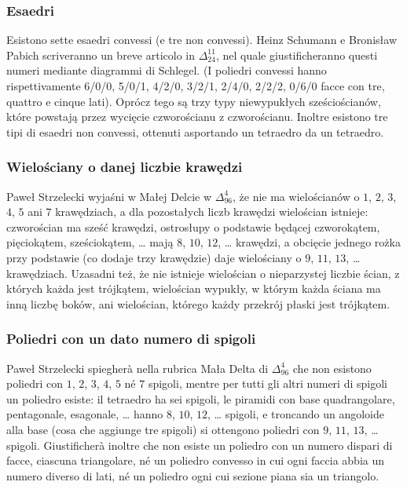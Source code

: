 \subsubsection{Esaedri} %
Esistono sette esaedri convessi (e tre non convessi). %
Heinz Schumann e Bronisław Pabich scriveranno un breve articolo in $\Delta_{24}^{11}$, nel quale giustificheranno questi numeri mediante diagrammi di Schlegel. %
(I poliedri convessi hanno rispettivamente 6/0/0, 5/0/1, 4/2/0, 3/2/1, 2/4/0, 2/2/2, 0/6/0 facce con tre, quattro e cinque lati). %
Oprócz tego są trzy typy niewypukłych sześciościanów, które powstają przez wycięcie czworościanu z czworościanu. %
Inoltre esistono tre tipi di esaedri non convessi, ottenuti asportando un tetraedro da un tetraedro. %

\subsubsection{Wielościany o danej liczbie krawędzi} %
Paweł Strzelecki wyjaśni w Małej Delcie w $\Delta_{96}^{4}$, że nie ma wielościanów o $1$, $2$, $3$, $4$, $5$ ani $7$ krawędziach, a dla pozostałych liczb krawędzi wielościan istnieje: czworościan ma sześć krawędzi, ostrosłupy o podstawie będącej czworokątem, pięciokątem, sześciokątem, \ldots{} mają $8$, $10$, $12$, \ldots{} krawędzi, a obcięcie jednego rożka przy podstawie (co dodaje trzy krawędzie) daje wielościany o $9$, $11$, $13$, \ldots{} krawędziach. Uzasadni też, że nie istnieje wielościan o nieparzystej liczbie ścian, z których każda jest trójkątem, wielościan wypukły, w którym każda ściana ma inną liczbę boków, ani wielościan, którego każdy przekrój płaski jest trójkątem. %
\subsubsection{Poliedri con un dato numero di spigoli} %
Paweł Strzelecki spiegherà nella rubrica Mała Delta di $\Delta_{96}^{4}$ che non esistono poliedri con $1$, $2$, $3$, $4$, $5$ né $7$ spigoli, mentre per tutti gli altri numeri di spigoli un poliedro esiste: il tetraedro ha sei spigoli, le piramidi con base quadrangolare, pentagonale, esagonale, \ldots{} hanno $8$, $10$, $12$, \ldots{} spigoli, e troncando un angoloide alla base (cosa che aggiunge tre spigoli) si ottengono poliedri con $9$, $11$, $13$, \ldots{} spigoli. Giustificherà inoltre che non esiste un poliedro con un numero dispari di facce, ciascuna triangolare, né un poliedro convesso in cui ogni faccia abbia un numero diverso di lati, né un poliedro ogni cui sezione piana sia un triangolo. %

